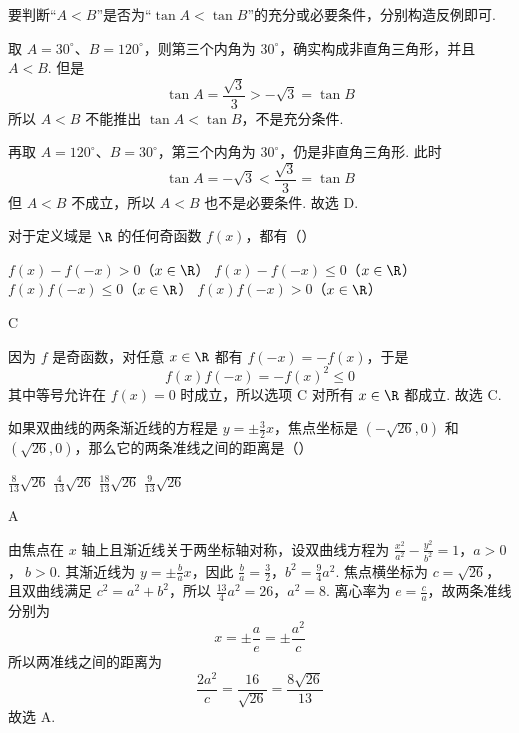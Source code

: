 \documentclass[UTF8,a4paper,oneside,11pt]{ctexbook}
\begin{document}
\begin{solution}
要判断“\(A<B\)”是否为“\(\tan A<\tan B\)”的充分或必要条件，分别构造反例即可.

取 \(A=30^\circ\)、\(B=120^\circ\)，则第三个内角为 \(30^\circ\)，确实构成非直角三角形，并且 \(A<B\). 但是
\[
\tan A=\frac{\sqrt3}{3}>-\sqrt3=\tan B
\]
所以 \(A<B\) 不能推出 \(\tan A<\tan B\)，不是充分条件.

再取 \(A=120^\circ\)、\(B=30^\circ\)，第三个内角为 \(30^\circ\)，仍是非直角三角形. 此时
\[
\tan A=-\sqrt3<\frac{\sqrt3}{3}=\tan B
\]
但 \(A<B\) 不成立，所以 \(A<B\) 也不是必要条件. 故选 D.
\end{solution}

\begin{problem}
对于定义域是 \(\R\) 的任何奇函数 \(f(x)\)，都有（\quad）

\choices
    {\(f(x)-f(-x)>0\)（\(x\in\R\)）}
    {\(f(x)-f(-x)\leqslant 0\)（\(x\in\R\)）}
    {\(f(x)f(-x)\leqslant 0\)（\(x\in\R\)）}
    {\(f(x)f(-x)>0\)（\(x\in\R\)）}
\end{problem}

\begin{answer}
C
\end{answer}

\begin{solution}
因为 \(f\) 是奇函数，对任意 \(x\in\R\) 都有 \(f(-x)=-f(x)\)，于是
\[
f(x)f(-x)=-f(x)^2\leqslant0
\]
其中等号允许在 \(f(x)=0\) 时成立，所以选项 C 对所有 \(x\in\R\) 都成立. 故选 C.
\end{solution}

\begin{problem}
如果双曲线的两条渐近线的方程是 \(y=\pm\frac{3}{2}x\)，焦点坐标是 \((-\sqrt{26},0)\) 和 \((\sqrt{26},0)\)，那么它的两条准线之间的距离是（\quad）

\choices
    {\(\frac{8}{13}\sqrt{26}\)}
    {\(\frac{4}{13}\sqrt{26}\)}
    {\(\frac{18}{13}\sqrt{26}\)}
    {\(\frac{9}{13}\sqrt{26}\)}
\end{problem}

\begin{answer}
A
\end{answer}

\begin{solution}
由焦点在 \(x\) 轴上且渐近线关于两坐标轴对称，设双曲线方程为
\(\frac{x^2}{a^2}-\frac{y^2}{b^2}=1\)，\(a>0\)，\(\ b>0\).
其渐近线为 \(y=\pm\frac ba x\)，因此
\(\frac{b}{a}=\frac32\)，\(b^2=\frac94a^2\).
焦点横坐标为 \(c=\sqrt{26}\)，且双曲线满足 \(c^2=a^2+b^2\)，所以
\(\frac{13}{4}a^2=26\)，\(a^2=8\).
离心率为 \(e=\frac ca\)，故两条准线分别为
\[
x=\pm\frac ae=\pm\frac{a^2}{c}
\]
所以两准线之间的距离为
\[
\frac{2a^2}{c}=\frac{16}{\sqrt{26}}=\frac{8\sqrt{26}}{13}
\]
故选 A.
\end{solution}
\end{document}
